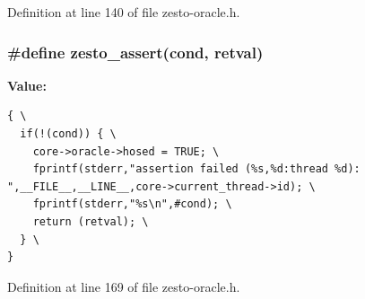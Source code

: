 Definition at line 140 of file zesto-oracle.h.
\subsubsection[{zesto\_\-assert}]{\setlength{\rightskip}{0pt plus 5cm}\#define zesto\_\-assert(cond, \/  retval)}\label{zesto-oracle_8h_4f942292a4c30024a9b7fe4f9b1820a4}


\textbf{Value:}

\begin{Code}\begin{verbatim}{ \
  if(!(cond)) { \
    core->oracle->hosed = TRUE; \
    fprintf(stderr,"assertion failed (%s,%d:thread %d): ",__FILE__,__LINE__,core->current_thread->id); \
    fprintf(stderr,"%s\n",#cond); \
    return (retval); \
  } \
}
\end{verbatim}
\end{Code}


Definition at line 169 of file zesto-oracle.h.


